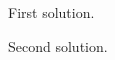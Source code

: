 \begin{Solution}{1}
      First solution.
   
\end{Solution}
\begin{Solution}{2}
      Second solution.
   
\end{Solution}
